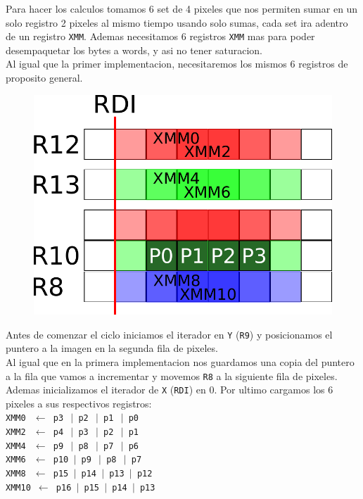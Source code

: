 Para hacer los calculos tomamos 6 set de 4 pixeles que nos permiten sumar en un solo registro 2 pixeles al mismo tiempo usando solo sumas, cada set ira adentro de un registro \texttt{XMM}. Ademas necesitamos 6 registros \texttt{XMM} mas para poder desempaquetar los bytes a words, y asi no tener saturacion. \\

\newpage
Al igual que la primer implementacion, necesitaremos los mismos 6 registros de proposito general. \\

\begin{figure}[h!]
	\centering
	\includegraphics[scale=0.5]{images/BlurASM2_0}
\end{figure}

Antes de comenzar el ciclo iniciamos el iterador en \texttt{Y} (\texttt{R9}) y posicionamos el puntero a la imagen en la segunda fila de pixeles. \\

Al igual que en la primera implementacion nos guardamos una copia del puntero a la fila que vamos a incrementar y movemos \texttt{R8} a la siguiente fila de pixeles. Ademas inicializamos el iterador de \texttt{X} (\texttt{RDI}) en 0. Por ultimo cargamos los 6 pixeles a sus respectivos registros:\\

\noindent
\texttt{XMM0 $\ \gets$ p3 $\ \vert$ p2 $\ \vert$ p1 $\ \vert$ p0} \\
\texttt{XMM2 $\ \gets$ p4 $\ \vert$ p3 $\ \vert$ p2 $\ \vert$ p1} \\
\texttt{XMM4 $\ \gets$ p9 $\ \vert$ p8 $\ \vert$ p7 $\ \vert$ p6} \\
\texttt{XMM6 $\ \gets$ p10 $\vert$ p9 $\ \vert$ p8 $\ \vert$ p7} \\
\texttt{XMM8 $\ \gets$ p15 $\vert$ p14 $\vert$ p13 $\vert$ p12} \\
\texttt{XMM10 $\gets$ p16 $\vert$ p15 $\vert$ p14 $\vert$ p13} \\

